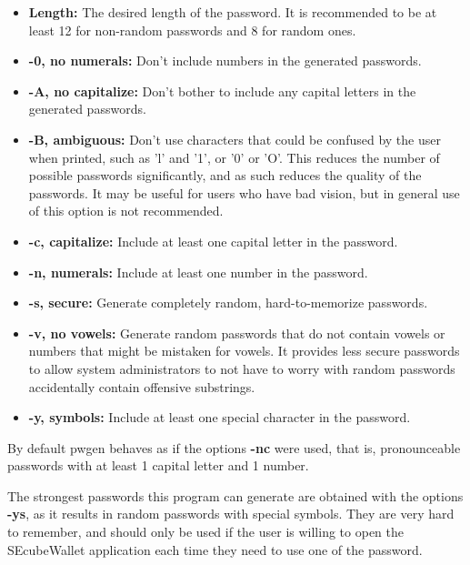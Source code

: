 \begin{itemize}
\setlength\itemsep{0pt}


\item \textbf{Length:} The desired length of the password. It is recommended to be at least 12 for non-random passwords and 8 for random ones.

\item \textbf{-0, no numerals:} 
Don't include numbers in the generated passwords. 

\item \textbf{-A, no capitalize:} 
Don't bother to include any capital letters in the generated passwords. 
    
\item \textbf{-B, ambiguous:}
Don't use characters that could be confused by the user when printed, such as 'l' and '1', or '0' or 'O'. This reduces the number of possible passwords significantly, and as such reduces the quality of the passwords. It may be useful for users who have bad vision, but in general use of this option is not recommended. 
    
\item \textbf{-c, capitalize:}
Include at least one capital letter in the password.

\item \textbf{-n, numerals:}
Include at least one number in the password.

\item \textbf{-s, secure:}
Generate completely random, hard-to-memorize passwords.

\item \textbf{-v, no vowels:}
Generate random passwords that do not contain vowels or numbers that might be mistaken for vowels. It provides less secure passwords to allow system administrators to not have to worry with random passwords accidentally contain offensive substrings. 

\item \textbf{-y, symbols:}
Include at least one special character in the password.
\end{itemize}

By default pwgen behaves as if the options \textbf{-nc} were used, that is, pronounceable passwords with at least 1 capital letter and 1 number.

The strongest passwords this program can generate are obtained with the options \textbf{-ys}, as it results in random passwords with special symbols. They are very hard to remember, and should only be used if the user is willing to open the SEcubeWallet application each time they need to use one of the password.


